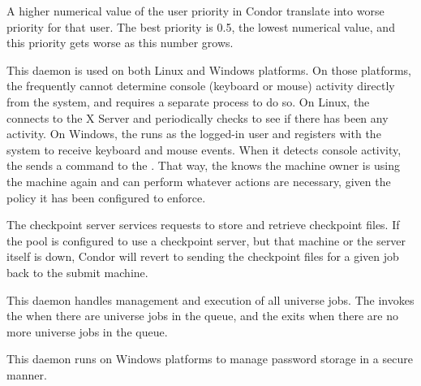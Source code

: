 \begin{description}
\Note A higher numerical value of the user priority in Condor
translate into worse priority for that user.  The best priority 
is 0.5, the lowest numerical value, and this priority gets
worse as this number grows.

\item[\Condor{kbdd}] This daemon
is used on both Linux and Windows platforms.
On those platforms, the  frequently cannot determine
console (keyboard or mouse) activity directly from the system, and
requires a separate process to do so.
On Linux, the
 connects to the X Server and periodically checks to see
if there has been any activity.
On Windows, the  runs as the logged-in user and registers
with the system to receive keyboard and mouse events.
When it detects console activity, the  sends a
command to the .  
That way, the  knows the machine owner
is using the machine again and can perform whatever actions are
necessary, given the policy it has been configured to enforce.

\item[\Condor{ckpt\_server}] The checkpoint server
services requests to store and retrieve checkpoint files.  
If the pool is configured to use a checkpoint server,
but that machine or the server itself is down,
Condor will revert to sending the checkpoint
files for a given job back to the submit machine.

\item[\Condor{gridmanager}] This daemon
handles management and execution of all 
universe jobs.
The  invokes the  when
there are  universe jobs in the queue,
and the  exits when there are no more
 universe jobs in the queue.

\item[\Condor{credd}] This daemon
runs on Windows platforms to manage password storage in a secure manner.


\end{description}
